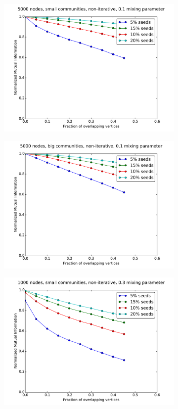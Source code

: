 \begin{figure}
\begin{subfigure}{0.5\textwidth}
    \includegraphics[width=\linewidth]{allplots/overlap_noniter_1mu_c.pdf}
    \end{subfigure}%
    \begin{subfigure}{0.5\textwidth}
    \includegraphics[width=\linewidth]{allplots/overlap_noniter_1mu_d.pdf}
    \end{subfigure}
    \begin{subfigure}{0.5\textwidth}
    \includegraphics[width=\linewidth]{allplots/overlap_noniter_3mu_a.pdf}

\end{subfigure}
\end{figure}
